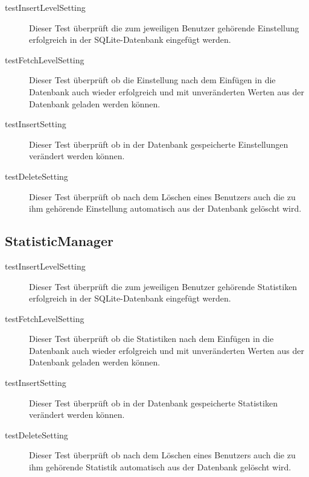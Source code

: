 \begin{description}

\item[testInsertLevelSetting]
Dieser Test überprüft die zum jeweiligen Benutzer gehörende Einstellung erfolgreich in der SQLite-Datenbank eingefügt werden. 

\item[testFetchLevelSetting]
Dieser Test überprüft ob die Einstellung nach dem Einfügen in die Datenbank auch wieder erfolgreich und mit unveränderten Werten aus der Datenbank geladen werden können.

\item[testInsertSetting]
Dieser Test überprüft ob in der Datenbank gespeicherte Einstellungen verändert werden können.

\item[testDeleteSetting]
Dieser Test überprüft ob nach dem Löschen eines Benutzers auch die zu ihm gehörende Einstellung automatisch aus der Datenbank gelöscht wird.

\end{description}

\subsection{StatisticManager}

\begin{description}

\item[testInsertLevelSetting]
Dieser Test überprüft die zum jeweiligen Benutzer gehörende Statistiken erfolgreich in der SQLite-Datenbank eingefügt werden. 

\item[testFetchLevelSetting]
Dieser Test überprüft ob die Statistiken nach dem Einfügen in die Datenbank auch wieder erfolgreich und mit unveränderten Werten aus der Datenbank geladen werden können.

\item[testInsertSetting]
Dieser Test überprüft ob in der Datenbank gespeicherte Statistiken verändert werden können.

\item[testDeleteSetting]
Dieser Test überprüft ob nach dem Löschen eines Benutzers auch die zu ihm gehörende Statistik automatisch aus der Datenbank gelöscht wird.

\end{description}


